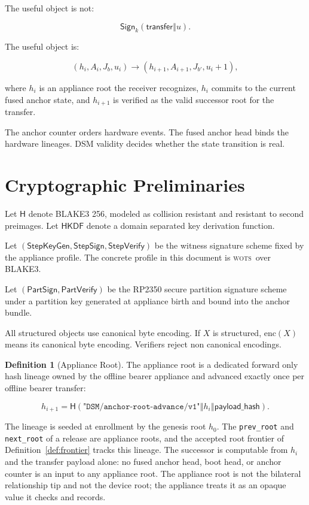\documentclass[11pt]{article}
\theoremstyle{definition}
\newtheorem{definition}[theorem]{Definition}
\theoremstyle{remark}
\newcommand{\concat}{\ensuremath{\mathbin{\Vert}}}
\newcommand{\Hf}{\ensuremath{\mathsf{H}}}
\newcommand{\HKDF}{\ensuremath{\mathsf{HKDF}}}
\newcommand{\StepKeyGen}{\ensuremath{\mathsf{StepKeyGen}}}
\newcommand{\StepSign}{\ensuremath{\mathsf{StepSign}}}
\newcommand{\StepVerify}{\ensuremath{\mathsf{StepVerify}}}
\newcommand{\PartSign}{\ensuremath{\mathsf{PartSign}}}
\newcommand{\PartVerify}{\ensuremath{\mathsf{PartVerify}}}
\newcommand{\ctx}[1]{\texttt{"#1"}}
\newcommand{\WOTS}{\textsc{wots}}
\newcommand{\Ahead}{\ensuremath{A}}
\newcommand{\Bhead}{\ensuremath{J}}
\begin{document}
The useful object is not:

\[
\mathsf{Sign}_k(\mathsf{transfer}\concat u).
\]

The useful object is:

\[
(h_i,\Ahead_i,\Bhead_b,u_i)
\rightarrow
(h_{i+1},\Ahead_{i+1},\Bhead_{b'},u_i+1),
\]

where \(h_i\) is an appliance root the receiver recognizes, \(h_i\) commits to the current fused anchor
state, and \(h_{i+1}\) is verified as the valid successor root for the transfer.

The anchor counter orders hardware events. The fused anchor head binds the hardware lineages.
DSM validity decides whether the state transition is real.

\section{Cryptographic Preliminaries}

Let \(\Hf\) denote BLAKE3 256, modeled as collision resistant and resistant to second preimages.
Let \(\HKDF\) denote a domain separated key derivation function.

Let \((\StepKeyGen,\StepSign,\StepVerify)\) be the witness signature scheme fixed by the appliance
profile. The concrete profile in this document is \WOTS\ over BLAKE3.

Let \((\PartSign,\PartVerify)\) be the RP2350 secure partition signature scheme under a partition
key generated at appliance birth and bound into the anchor bundle.

All structured objects use canonical byte encoding. If \(X\) is structured, \(\mathrm{enc}(X)\)
means its canonical byte encoding. Verifiers reject non canonical encodings.

\begin{definition}[Appliance Root]\label{def:approot}
The appliance root is a dedicated forward only hash lineage owned by the offline bearer appliance
and advanced exactly once per offline bearer transfer:

\[
h_{i+1}
=
\Hf(\ctx{DSM/anchor-root-advance/v1}\concat h_i\concat \mathsf{payload\_hash}).
\]

The lineage is seeded at enrollment by the genesis root \(h_0\). The \texttt{prev\_root} and
\texttt{next\_root} of a release are appliance roots, and the accepted root frontier of
Definition~\ref{def:frontier} tracks this lineage. The successor is computable from \(h_i\) and
the transfer payload alone: no fused anchor head, boot head, or anchor counter is an input to any
appliance root. The appliance root is not the bilateral relationship tip and not the device root;
the appliance treats it as an opaque value it checks and records.
\end{definition}
\end{document}
